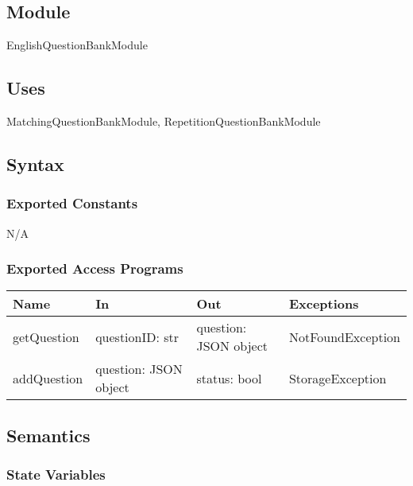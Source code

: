 \documentclass[12pt, titlepage]{article}
\begin{document}
\subsection{Module}

EnglishQuestionBankModule

\subsection{Uses}

MatchingQuestionBankModule, RepetitionQuestionBankModule

\subsection{Syntax}

\subsubsection{Exported Constants}

N/A

\subsubsection{Exported Access Programs}

\begin{center}
\begin{tabular}{p{3cm} p{4cm} p{4cm} p{5cm}}
\hline
\textbf{Name} & \textbf{In} & \textbf{Out} & \textbf{Exceptions} \\
\hline
getQuestion & \raggedright\arraybackslash questionID: str & \raggedright\arraybackslash question: JSON object & \raggedright\arraybackslash NotFoundException \\
\hline
addQuestion & \raggedright\arraybackslash question: JSON object & \raggedright\arraybackslash status: bool & \raggedright\arraybackslash StorageException \\
\hline
\end{tabular}
\end{center}

\subsection{Semantics}

\subsubsection{State Variables}
\end{document}
